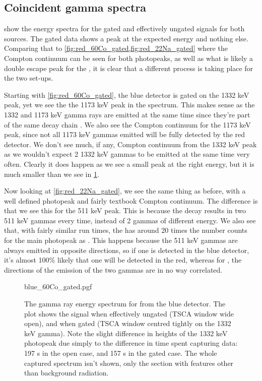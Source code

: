 \documentclass[11pt]{article}
\numberwithin{equation}{section}
\numberwithin{figure}{section}
\numberwithin{table}{section}
\begin{document}
\subsection{Coincident gamma spectra}
\par {} show the energy spectra for the gated and effectively ungated signals for both sources. The gated data shows a peak at the expected energy and nothing else. Comparing that to \cref{fig:red_60Co_gated,fig:red_22Na_gated} where the Compton continuum can be seen for both photopeaks, as well as what is likely a double escape peak for the , it is clear that a different process is taking place for the two set-ups.\newline
\par Starting with \cref{fig:red_60Co_gated}, the blue detector is gated on the 1332 keV peak, yet we see the the 1173 keV peak in the spectrum. This makes sense as the 1332 and 1173 keV gamma rays are emitted at the same time since they're part of the same decay chain \cite{60CoDecay}. We also see the Compton continuum for the 1173 keV peak, since not all 1173 keV gammas emitted will be fully detected by the red detector. We don't see much, if any, Compton continuum from the 1332 keV peak as we wouldn't expect 2 1332 keV gammas to be emitted at the same time very often. Clearly it does happen as we see a small peak at the right energy, but it is much smaller than we see in \cref{fig:blue_60Co_gated}. 
\par Now looking at \cref{fig:red_22Na_gated}, we see the same thing as before, with a well defined photopeak and fairly textbook Compton continuum. The difference is that we see this for the 511 keV peak. This is because the decay results in two 511 keV gammas every time, instead of 2 gammas of different energy. We also see that, with fairly similar run times, the  has around 20 times the number counts for the main photopeak as . This happens because the 511 keV gammas are always emitted in opposite directions, so if one is detected in the blue detector, it's almost 100\% likely that one will be detected in the red, whereas for , the directions of the emission of the two gammas are in no way correlated. 

\begin{figure}[H]
    \begin{center}
       {blue_60Co_gated.pgf}
       \caption{The gamma ray energy spectrum for  from the blue detector. The plot shows the signal when effectively ungated (TSCA window wide open), and when gated (TSCA window centred tightly on the 1332 keV gamma). Note the slight difference in heights of the 1332 keV photopeak due simply to the difference in time spent capturing data: 197 s in the open case, and 157 s in the gated case. The whole captured spectrum isn't shown, only the section with features other than background radiation.}
       \label{fig:blue_60Co_gated}
    \end{center}
\end{figure}
\end{document}
